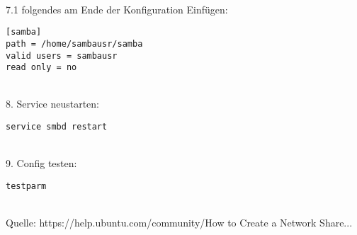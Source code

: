 ~\\
7.1 folgendes am Ende der Konfiguration Einfügen:
\begin{lstlisting}
[samba]
path = /home/sambausr/samba
valid users = sambausr
read only = no
\end{lstlisting}
~\\
8. Service neustarten:
\begin{lstlisting}
service smbd restart
\end{lstlisting}
~\\
9. Config testen:
\begin{lstlisting}
testparm
\end{lstlisting}
~\\Quelle: https://help.ubuntu.com/community/How to Create a Network Share... \cite{samba}
